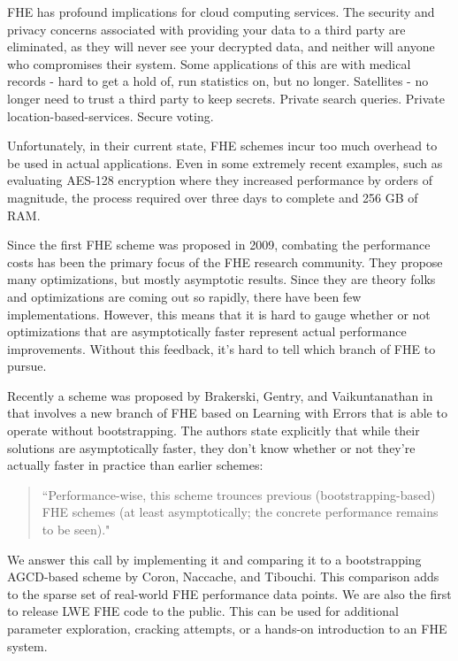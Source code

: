 \documentclass[letterpaper,twocolumn,10pt]{article}
\begin{document}
FHE has profound implications for cloud computing services. The security and privacy concerns associated with providing your data to a third party are eliminated, as they will never see your decrypted data, and neither will anyone who compromises their system. Some applications of this are with medical records - hard to get a hold of, run statistics on, but no longer. Satellites - no longer need to trust a third party to keep secrets. Private search queries. Private location-based-services. Secure voting.

Unfortunately, in their current state, FHE schemes incur too much overhead to be used in actual applications. Even in some extremely recent examples, such as evaluating AES-128 encryption where they increased performance by orders of magnitude, the process required over three days to complete and 256 GB of RAM\cite{AES}. 

Since the first FHE scheme was proposed in 2009, combating the performance costs has been the primary focus of the FHE research community. They propose many optimizations, but mostly asymptotic results. Since they are theory folks and optimizations are coming out so rapidly, there have been few implementations. However, this means that it is hard to gauge whether or not optimizations that are asymptotically faster represent actual performance improvements. Without this feedback, it's hard to tell which branch of FHE to pursue.

Recently a scheme was proposed by Brakerski, Gentry, and Vaikuntanathan in \cite{SansBootstrapping} that involves a new branch of FHE based on Learning with Errors that is able to operate without bootstrapping. The authors state explicitly that while their solutions are asymptotically faster, they don't know whether or not they're actually faster in practice than earlier schemes:


\begin{quotation}
``Performance-wise, this scheme trounces previous (bootstrapping-based) FHE schemes (at least asymptotically; the concrete performance remains to be seen)."
\end{quotation}

We answer this call by implementing it and comparing it to a bootstrapping AGCD-based scheme by Coron, Naccache, and Tibouchi. This comparison adds to the sparse set of real-world FHE performance data points. We are also the first to release LWE FHE code to the public. This can be used for additional parameter exploration, cracking attempts, or a hands-on introduction to an FHE system.
\end{document}
